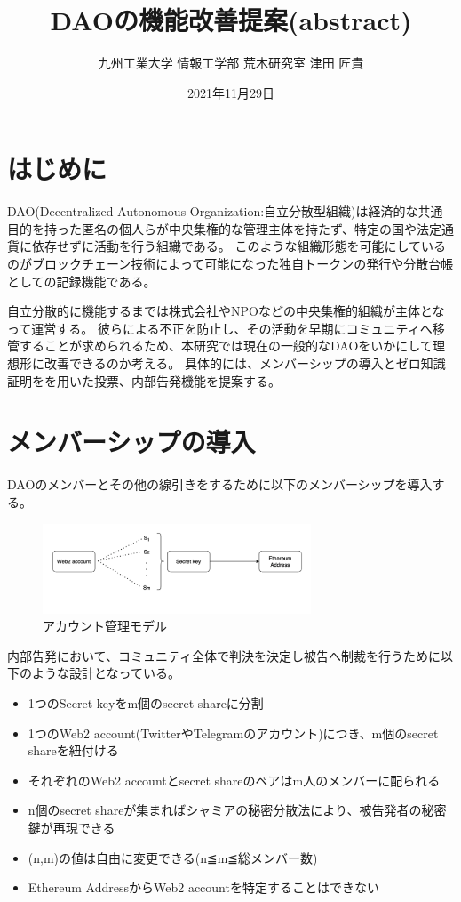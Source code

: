 \documentclass[twocolumn,a4j]{jarticle}
\title{DAOの機能改善提案(abstract)}
\author{九州工業大学 情報工学部 荒木研究室 津田 匠貴}
\date{2021年11月29日}
\begin{document}
\maketitle
\section{はじめに}
DAO(Decentralized Autonomous Organization:自立分散型組織)は経済的な共通目的を持った匿名の個人らが中央集権的な管理主体を持たず、特定の国や法定通貨に依存せずに活動を行う組織である。
このような組織形態を可能にしているのがブロックチェーン技術によって可能になった独自トークンの発行や分散台帳としての記録機能である。

自立分散的に機能するまでは株式会社やNPOなどの中央集権的組織が主体となって運営する。
彼らによる不正を防止し、その活動を早期にコミュニティへ移管することが求められるため、本研究では現在の一般的なDAOをいかにして理想形に改善できるのか考える。
具体的には、メンバーシップの導入とゼロ知識証明をを用いた投票、内部告発機能を提案する。
\section{メンバーシップの導入}
DAOのメンバーとその他の線引きをするために以下のメンバーシップを導入する。
\begin{figure}[htbp]
  \begin{center}
    \includegraphics[width=80mm]{account.png}
    \caption{アカウント管理モデル}
  \end{center}
\end{figure}

内部告発において、コミュニティ全体で判決を決定し被告へ制裁を行うために以下のような設計となっている。
\begin{itemize}
  \item 1つのSecret keyをm個のsecret shareに分割
  \item 1つのWeb2 account(TwitterやTelegramのアカウント)につき、m個のsecret shareを紐付ける
  \item それぞれのWeb2 accountとsecret shareのペアはm人のメンバーに配られる
  \item n個のsecret shareが集まればシャミアの秘密分散法により、被告発者の秘密鍵が再現できる
  \item (n,m)の値は自由に変更できる(n≦m≦総メンバー数)
  \item Ethereum AddressからWeb2 accountを特定することはできない
\end{itemize}
\end{document}
